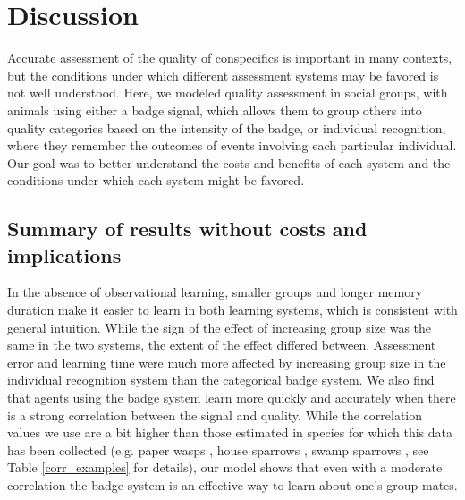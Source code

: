 \section*{Discussion}
Accurate assessment of the quality of conspecifics is important in many contexts, but the conditions under which different assessment systems may be favored is not well understood. Here, we modeled quality assessment in social groups, with animals using either a badge signal, which allows them to group others into quality categories based on the intensity of the badge, or individual recognition, where they remember the outcomes of events involving each particular individual. Our goal was to better understand the costs and benefits of each system and the conditions under which each system might be favored. 

\subsection*{Summary of results without costs and implications} %
In the absence of observational learning, smaller groups and longer memory duration make it easier to learn in both learning systems, which is consistent with general intuition. While the sign of the effect of increasing group size was the same in the two systems, the extent of the effect differed between. Assessment error and learning time were much more affected by increasing group size in the individual recognition system than the categorical badge system. We also find that agents using the badge system learn more quickly and accurately when there is a strong correlation between the signal and quality. While the correlation values we use are a bit higher than those estimated in species for which this data has been collected (e.g. paper wasps \cite{Tibbetts:2004kx}, house sparrows \cite{Veiga:1993fk}, swamp sparrows \cite{Olsen:2010uq}, see Table \ref{corr_examples} for details), our model shows that even with a moderate correlation the badge system is an effective way to learn about one's group mates. 


